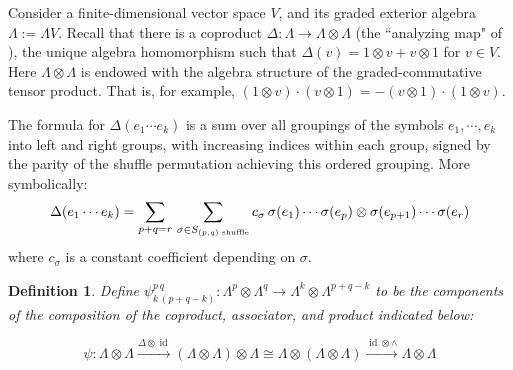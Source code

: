 \documentclass[12pt]{article}
\numberwithin{equation}{section}
\theoremstyle{plain}
\newtheorem{definition}{Definition}[section]
\theoremstyle{definition}
\renewcommand{\L}{\Lambda}
\begin{document}
Consider a finite-dimensional vector space $V$, and its graded exterior algebra $\L:=\L V$. Recall that there is a coproduct $\Delta:\L \rightarrow  \L \otimes \L $ (the ``analyzing map" of \cite{chevalley}), the unique algebra homomorphism such that $\Delta(v)=1\otimes v + v \otimes 1$ for $v\in V$. Here $\L \otimes \L$ is endowed with the algebra structure of the graded-commutative tensor product. That is, for example, $(1\otimes v) \cdot (v\otimes 1) = - (v\otimes 1) \cdot (1\otimes v)$.

The formula for $\Delta(e_1\cdots e_k)$ is a sum over all groupings of the symbols $e_1,\cdots,e_k$ into left and right groups, with increasing indices within each group, signed by the parity of the shuffle permutation achieving this ordered grouping. More symbolically:
\begin{align*} \Delta(e_1\cdots e_k)= \sum_{p+q=r}\thinspace\sum_{\sigma \in S_{(p,q)\text{ shuffle}}}c_{\sigma}\thinspace\sigma(e_1)\cdots\sigma(e_p)\otimes\sigma(e_{p+1})\cdots\sigma(e_{r})
\end{align*}
where $c_{\sigma}$ is a constant coefficient depending on $\sigma$.

\begin{definition} Define $\psi^{p\, q}_{k\,(p+q-k)}: \L^{p}\otimes \L^{q}\rightarrow  \L^{k}\otimes \L^{p+q-k}$ to be the components of the composition of the coproduct, associator, and product indicated below:

\[\psi: \L \otimes \L \overset{\Delta\otimes\operatorname{id}}{\rightarrow}  (\L \otimes \L) \otimes \L \cong \L \otimes (\L \otimes \L)\overset{\operatorname{id}\otimes \wedge }{\rightarrow}  \L \otimes \L\]
\end{definition}
\end{document}
